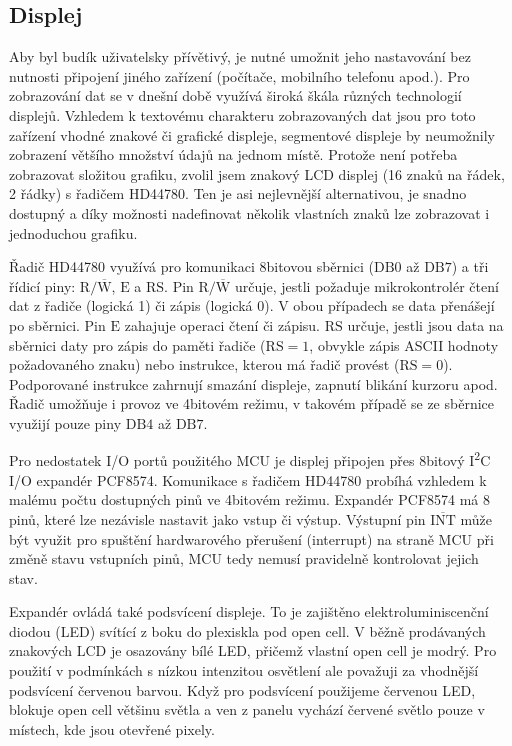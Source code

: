 \subsection{Displej}
Aby byl budík uživatelsky přívětivý, je nutné umožnit jeho nastavování bez
nutnosti připojení jiného zařízení (počítače, mobilního telefonu apod.).
Pro zobrazování dat se v dnešní době využívá široká škála různých technologií
displejů. Vzhledem k textovému charakteru zobrazovaných dat jsou pro toto
zařízení vhodné znakové či grafické displeje, segmentové displeje by neumožnily
zobrazení většího množství údajů na jednom místě. Protože není potřeba
zobrazovat složitou grafiku, zvolil jsem znakový LCD displej (16 znaků na
řádek, 2 řádky) s řadičem HD44780. Ten je asi nejlevnější alternativou, je
snadno dostupný a díky možnosti nadefinovat několik vlastních znaků lze
zobrazovat i jednoduchou grafiku.

Řadič HD44780 využívá pro komunikaci 8bitovou sběrnici ($\mathrm{DB0}$ až
$\mathrm{DB7}$) a tři řídicí piny: $\mathrm{R}/\overline{\mathrm{W}}$,
$\mathrm{E}$ a $\mathrm{RS}$. Pin $\mathrm{R}/\overline{\mathrm{W}}$ určuje,
jestli požaduje mikrokontrolér čtení dat z řadiče (logická 1) či zápis (logická
0). V obou případech se data přenášejí po sběrnici. Pin $\mathrm{E}$ zahajuje
operaci čtení či zápisu. $\mathrm{RS}$ určuje, jestli jsou data na sběrnici
daty pro zápis do paměti řadiče ($\mathrm{RS} = 1$, obvykle zápis ASCII hodnoty
požadovaného znaku) nebo instrukce, kterou má řadič provést ($\mathrm{RS} =
0$). Podporované instrukce zahrnují smazání displeje, zapnutí blikání kurzoru
apod. Řadič umožňuje i provoz ve 4bitovém režimu, v takovém případě se ze
sběrnice využijí pouze piny $\mathrm{DB4}$ až $\mathrm{DB7}$.~\cite{dshHD44780}

Pro nedostatek I/O portů použitého MCU je displej připojen přes
8bitový I\textsuperscript{2}C I/O expandér PCF8574. Komunikace s řadičem
HD44780 probíhá vzhledem k malému počtu dostupných pinů ve 4bitovém režimu.
Expandér PCF8574 má 8 pinů, které lze nezávisle nastavit jako vstup či výstup.
Výstupní pin $\overline{\mathrm{INT}}$ může být využit pro spuštění
hardwarového přerušení (interrupt) na straně MCU při změně stavu vstupních
pinů, MCU tedy nemusí pravidelně kontrolovat jejich stav.~\cite{dshPCF8574}


Expandér ovládá také podsvícení displeje. To je zajištěno elektroluminiscenční
diodou (LED) svítící z boku do plexiskla pod open cell. V běžně prodávaných
znakových LCD je osazovány bílé LED, přičemž vlastní open cell je modrý. Pro
použití v podmínkách s nízkou intenzitou osvětlení ale považuji za vhodnější
podsvícení červenou barvou. Když pro podsvícení použijeme červenou LED, blokuje
open cell většinu světla a ven z panelu vychází červené světlo pouze v místech,
kde jsou otevřené pixely.

